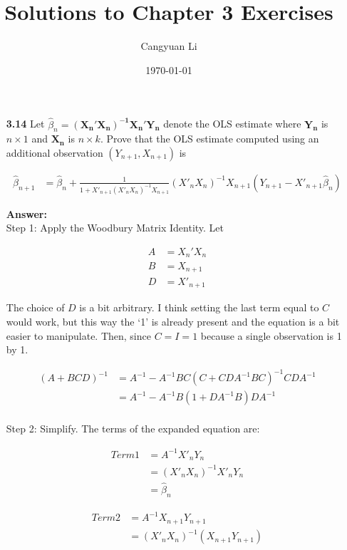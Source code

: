 \documentclass[14pt]{extreport}
\title{Solutions to Chapter 3 Exercises}
\author{Cangyuan Li}
\date{\today}
\newcommand{\answer}[0]{\medskip \textbf{Answer:} \medskip \\}
\begin{document}
\maketitle

\begin{enumerate}
    \item [\textbf{3.14}]
    Let \(\widehat{\beta}_n = \mathbf{(X_n'X_n)^{-1}X_n'Y_n}\) denote the OLS estimate where 
    \(\mathbf{Y_n}\) is \(n \times 1\) and \(\mathbf{X_n}\) is \(n \times k\). Prove that the OLS estimate 
    computed using an additional observation \((Y_{n+1}, X_{n+1})\) is 

    \begin{align*}
        \widehat{\beta}_{n+1} &= \widehat{\beta}_n + \frac{1}{1 + X'_{n+1}(X'_n X_n)^{-1}X_{n+1}}
        (X'_{n} X_{n})^{-1}X_{n+1}(Y_{n+1} - X'_{n+1}\widehat{\beta}_n)
    \end{align*}

    \answer
    Step 1: Apply the Woodbury Matrix Identity. Let 

    \begin{align*}
        A &= X_n'X_n \\
        B &= X_{n+1} \\
        D &= X'_{n+1}
    \end{align*}

    The choice of \(D\) is a bit arbitrary. I think setting the last term equal to \(C\) would work,
    but this way the `1' is already present and the equation is a bit easier to manipulate.
    Then, since \(C = I = 1\) because a single observation is 1 by 1.

    \begin{align*}
        (A + BCD)^{-1} &= A^{-1} - A^{-1}BC\left(C + CDA^{-1}BC\right)^{-1}CDA^{-1} \\
        &= A^{-1} - A^{-1}B(1 + DA^{-1}B)DA^{-1} \\
    \end{align*}

    Step 2: Simplify. The terms of the expanded equation are:

    \begin{align*}
        Term1 &= A^{-1}X'_nY_n \\
        &= (X'_n X_n)^{-1}X'_nY_n \\
        &= \widehat{\beta}_n
    \end{align*}

    \begin{align*}
        Term2 &= A^{-1}X_{n+1}Y_{n+1} \\
        &= (X'_n X_n)^{-1}(X_{n+1} Y_{n+1})
    \end{align*}


\end{enumerate}
\end{document}

